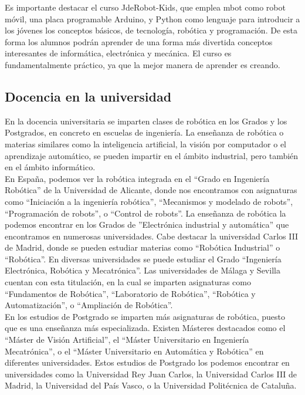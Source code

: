 Es importante destacar el curso JdeRobot-Kids, que emplea mbot como robot móvil, una placa programable Arduino, y Python como lenguaje para introducir a los jóvenes los conceptos básicos, de tecnología, robótica y programación. De esta forma los alumnos podrán aprender de una forma más divertida conceptos interesantes de informática, electrónica y mecánica. El curso es fundamentalmente práctico, ya que la mejor manera de aprender es creando.

\subsection{Docencia en la universidad}
En la docencia universitaria se imparten clases de robótica en los Grados y los Postgrados, en concreto en escuelas de ingeniería. La enseñanza de robótica o materias similares como la inteligencia artificial, la visión por computador o el aprendizaje automático, se pueden impartir en el ámbito industrial, pero también en el ámbito informático.\\

En España, podemos ver la robótica integrada en el ``Grado en Ingeniería Robótica'' de la Universidad de Alicante, donde nos encontramos con asignaturas como ``Iniciación a la ingeniería robótica'', ``Mecanismos y modelado de robots'', ``Programación de robots'', o ``Control de robots''. La enseñanza de robótica la podemos encontrar en los Grados de ''Electrónica industrial y automática'' que encontramos en numerosas universidades. Cabe destacar la universidad Carlos III de Madrid, donde se pueden estudiar materias como ``Robótica Industrial'' o ``Robótica''. En diversas universidades se puede estudiar el Grado ``Ingeniería Electrónica, Robótica y Mecatrónica''. Las universidades de Málaga y Sevilla cuentan con esta titulación, en la cual se imparten asignaturas como ``Fundamentos de Robótica'', ``Laboratorio de Robótica'', ``Robótica y Automatización'', o ``Ampliación de Robótica''.\\

En los estudios de Postgrado se imparten más asignaturas de robótica, puesto que es una enseñanza más especializada. Existen Másteres destacados como el ``Máster de Visión Artificial'', el ``Máster Universitario en Ingeniería Mecatrónica'', o el ``Máster Universitario en Automática y Robótica'' en diferentes universidades. Estos estudios de Postgrado los podemos encontrar en universidades como la Universidad Rey Juan Carlos, la Universidad Carlos III de Madrid, la Universidad del País Vasco, o la Universidad Politécnica de Cataluña.\\

